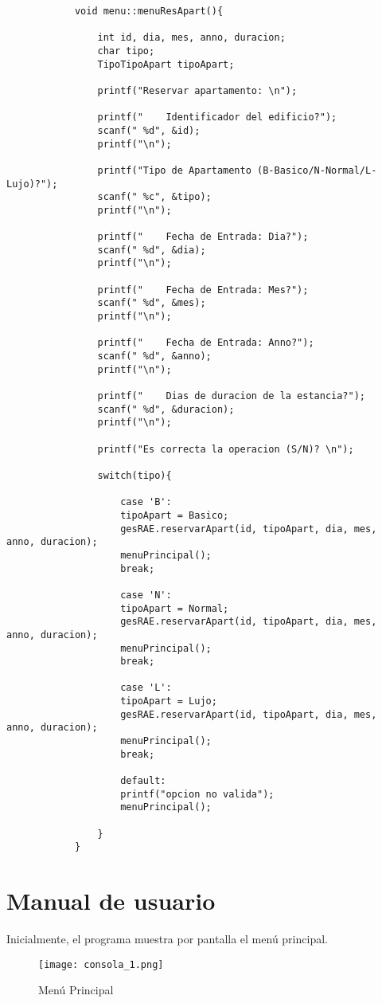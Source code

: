 \documentclass[12pt]{article}
\begin{document}
			\begin{lstlisting}
			void menu::menuResApart(){
				
				int id, dia, mes, anno, duracion;
				char tipo;
				TipoTipoApart tipoApart;
				
				printf("Reservar apartamento: \n");
				
				printf("    Identificador del edificio?");
				scanf(" %d", &id);
				printf("\n");
				
				printf("Tipo de Apartamento (B-Basico/N-Normal/L-Lujo)?");
				scanf(" %c", &tipo);
				printf("\n");
				
				printf("    Fecha de Entrada: Dia?");
				scanf(" %d", &dia);
				printf("\n");
				
				printf("    Fecha de Entrada: Mes?");
				scanf(" %d", &mes);
				printf("\n");
				
				printf("    Fecha de Entrada: Anno?");
				scanf(" %d", &anno);
				printf("\n");
				
				printf("    Dias de duracion de la estancia?");
				scanf(" %d", &duracion);
				printf("\n");
				
				printf("Es correcta la operacion (S/N)? \n");
				
				switch(tipo){
					
					case 'B':
					tipoApart = Basico;
					gesRAE.reservarApart(id, tipoApart, dia, mes, anno, duracion);
					menuPrincipal();
					break;
					
					case 'N':
					tipoApart = Normal;
					gesRAE.reservarApart(id, tipoApart, dia, mes, anno, duracion);
					menuPrincipal();
					break;
					
					case 'L':
					tipoApart = Lujo;
					gesRAE.reservarApart(id, tipoApart, dia, mes, anno, duracion);
					menuPrincipal();
					break;
					
					default:
					printf("opcion no valida");
					menuPrincipal();
					
				}
			}
			\end{lstlisting}	
			
			\newpage
			
			\section{Manual de usuario}
			
			Inicialmente, el programa muestra por pantalla el menú principal.
			\begin{figure}[H]
				\centering
				\texttt{[image: consola\_1.png]}
				\caption{Menú Principal}
				\label{fig:png}
			\end{figure}
			
\end{document}
